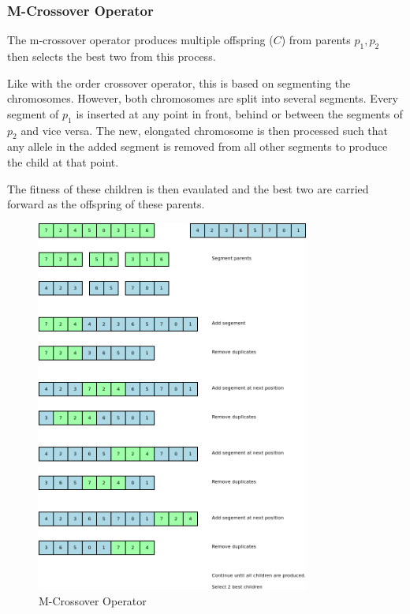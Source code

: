 \documentclass[10pt, a4paper]{article}
\begin{document}
\subsubsection{M-Crossover Operator}

The m-crossover operator\cite{Mudaliar2013Unraveling} produces multiple 
offspring ($C$) from parents $p_1, p_2$ then selects the best two from this 
process.

Like with the order crossover operator, this is based on segmenting the
chromosomes. However, both chromosomes are split into several segments. Every
segment of $p_1$ is inserted at any point in front, behind or between the
segments of $p_2$ and vice versa. The new, elongated chromosome is then
processed such that any allele in the added segment is removed from all other
segments to produce the child at that point.

The fitness of these children is then evaulated and the best two are carried 
forward as the offspring of these parents.

\begin{figure}[h]
\centering
\includegraphics[width=0.8\textwidth]{img/m-crossover-operator}
\caption{M-Crossover Operator}
\label{fig:m-crossover-operator}
\end{figure}
\end{document}
